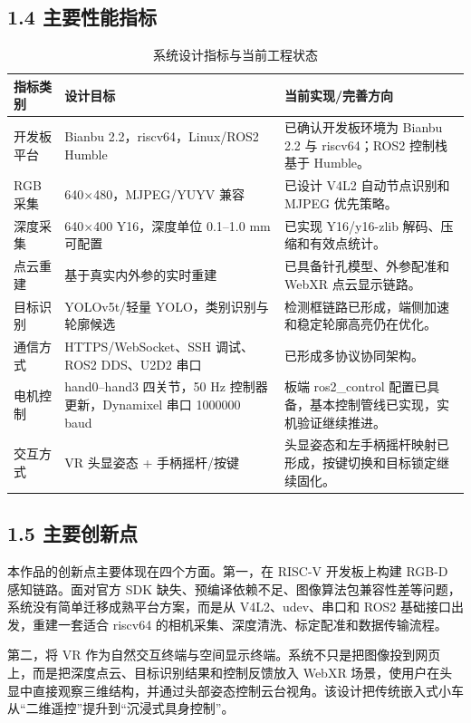 \documentclass[UTF8,a4paper,zihao=-4]{ctexart}
\begin{document}
\subsection*{1.4 主要性能指标}

\begin{table}[htbp]
\centering
\caption{系统设计指标与当前工程状态}
\begin{tabular}{p{}p{}p{}}
\toprule
指标类别 & 设计目标 & 当前实现/完善方向 \\
\midrule
开发板平台 & Bianbu 2.2，riscv64，Linux/ROS2 Humble & 已确认开发板环境为 Bianbu 2.2 与 riscv64；ROS2 控制栈基于 Humble。 \\
RGB 采集 & 640$\times$480，MJPEG/YUYV 兼容 & 已设计 V4L2 自动节点识别和 MJPEG 优先策略。 \\
深度采集 & 640$\times$400 Y16，深度单位 0.1--1.0 mm 可配置 & 已实现 Y16/y16-zlib 解码、压缩和有效点统计。 \\
点云重建 & 基于真实内外参的实时重建 & 已具备针孔模型、外参配准和 WebXR 点云显示链路。 \\
目标识别 & YOLOv5t/轻量 YOLO，类别识别与轮廓候选 & 检测框链路已形成，端侧加速和稳定轮廓高亮仍在优化。 \\
通信方式 & HTTPS/WebSocket、SSH 调试、ROS2 DDS、U2D2 串口 & 已形成多协议协同架构。 \\
电机控制 & hand0--hand3 四关节，50 Hz 控制器更新，Dynamixel 串口 1000000 baud & 板端 ros2\_control 配置已具备，基本控制管线已实现，实机验证继续推进。 \\
交互方式 & VR 头显姿态 + 手柄摇杆/按键 & 头显姿态和左手柄摇杆映射已形成，按键切换和目标锁定继续固化。 \\
\bottomrule
\end{tabular}
\end{table}

\subsection*{1.5 主要创新点}

本作品的创新点主要体现在四个方面。第一，在 RISC-V 开发板上构建 RGB-D 感知链路。面对官方 SDK 缺失、预编译依赖不足、图像算法包兼容性差等问题，系统没有简单迁移成熟平台方案，而是从 V4L2、udev、串口和 ROS2 基础接口出发，重建一套适合 riscv64 的相机采集、深度清洗、标定配准和数据传输流程。

第二，将 VR 作为自然交互终端与空间显示终端。系统不只是把图像投到网页上，而是把深度点云、目标识别结果和控制反馈放入 WebXR 场景，使用户在头显中直接观察三维结构，并通过头部姿态控制云台视角。该设计把传统嵌入式小车从“二维遥控”提升到“沉浸式具身控制”。
\end{document}
